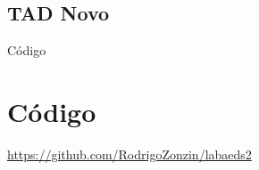 \subsection{TAD Novo}

{Código}
\begin{multicols}{2}

	\label{cod:ex12.h}
\end{multicols}

\vspace{12pt} 

\begin{multicols}{2}

	\label{cod:ex12.c}
\end{multicols}

\vspace{12pt} 

\begin{multicols}{2}

	\label{cod:main_q12.c}
\end{multicols}

\vspace{12pt} 

\begin{multicols}{2}

	\label{cod:Makefile_q12}
\end{multicols}

\section{Código}
\href{https://github.com/RodrigoZonzin/labaeds2}{https://github.com/RodrigoZonzin/labaeds2}

